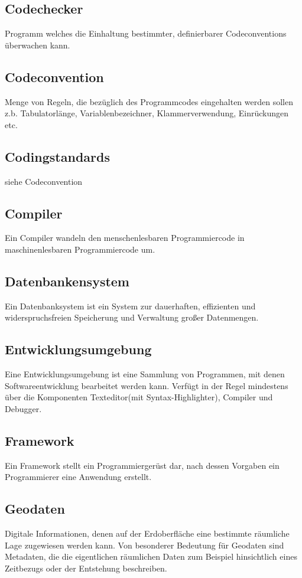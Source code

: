 \documentclass[11pt,a4paper]{article}
\begin{document}
\subsection{Codechecker}
 Programm welches die Einhaltung bestimmter, definierbarer Codeconventions überwachen kann.
\subsection{Codeconvention}
Menge von Regeln, die bezüglich des Programmcodes eingehalten werden sollen z.b. Tabulatorlänge, Variablenbezeichner, Klammerverwendung, Einrückungen etc.
\subsection{Codingstandards}
siehe Codeconvention
\subsection{Compiler}
Ein Compiler wandeln  den menschenlesbaren Programmiercode in maschinenlesbaren Programmiercode um.
\subsection{Datenbankensystem}
Ein Datenbanksystem ist ein  System zur dauerhaften, effizienten und widerspruchsfreien Speicherung  und Verwaltung großer Datenmengen.
\subsection{Entwicklungsumgebung}
Eine Entwicklungsumgebung ist eine Sammlung von Programmen, mit denen Softwareentwicklung bearbeitet werden kann. Verfügt in der Regel mindestens über die Komponenten Texteditor(mit Syntax-Highlighter), Compiler und Debugger.
\subsection{Framework}
Ein Framework stellt ein Programmiergerüst dar, nach dessen Vorgaben ein Programmierer eine Anwendung erstellt.
\subsection{Geodaten}  
Digitale Informationen, denen auf der Erdoberfläche eine bestimmte räumliche Lage zugewiesen werden kann. Von besonderer Bedeutung für Geodaten sind Metadaten, die die eigentlichen räumlichen Daten zum Beispiel hinsichtlich eines Zeitbezugs oder der Entstehung beschreiben.
\end{document}
